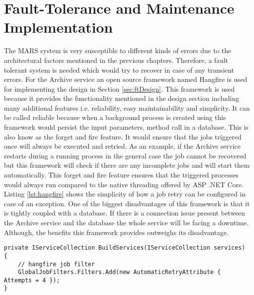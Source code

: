 \newpage
\section{Fault-Tolerance and Maintenance Implementation}
The MARS system is very susceptible to different kinds of errors due to the architectural factors mentioned in the previous chapters. Therefore, a fault tolerant
system is needed which would try to recover in case of any transient errors. For the Archive service an open source framework
named Hangfire is used for implementing the design in Section \ref{sec:ftDesign}. This framework is used because it provides
the functionality mentioned in the design section including many additional features i.e. reliability, easy maintainability and simplicity. It can be called
reliable because when a background process is created using this framework would persist the input parameters, method call in a database. 
This is also know as the forget and fire feature. It would
ensure that the jobs triggered once will always be executed and retried. As an example, if the
Archive service restarts during a running process in the general case the job cannot be recovered but this framework will check if 
there are any incomplete jobs and will start them automatically. This forget and fire 
feature ensures that the triggered processes would always run compared to the native threading offered by ASP .NET Core.
Listing \ref{lst:hangfire}
shows the simplicity of how a job retry can be configured in case of an exception. One of the biggest disadvantages of this framework is that it is 
tightly coupled
with a database. If there is a connection issue present between the Archive service and the database the whole service will be facing a downtime.  Although, the 
benefits this framework provides outweighs its disadvantage.

\begin{lstlisting}[language={[Sharp]C}, caption={Hangfire retry attempt configuration}, captionpos=b,label={lst:hangfire}]
private IServiceCollection BuildServices(IServiceCollection services)
{
    // hangfire job filter
    GlobalJobFilters.Filters.Add(new AutomaticRetryAttribute { Attempts = 4 });
}
\end{lstlisting}

